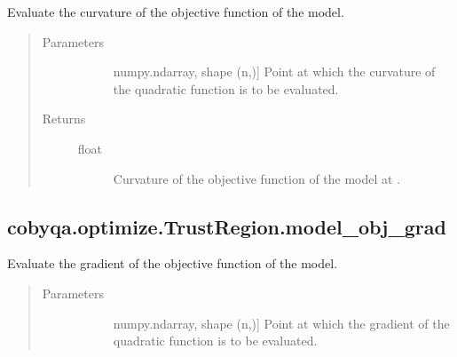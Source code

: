\documentclass[letterpaper,10pt,english]{sphinxmanual}
\begin{document}
\begin{fulllineitems}
\begin{fulllineitems}
\label{\detokenize{refs/generated/cobyqa.optimize.TrustRegion.model_obj_curv:cobyqa.optimize.TrustRegion.model_obj_curv}}
\sphinxAtStartPar
Evaluate the curvature of the objective function of the model.
\begin{quote}\begin{description}
\item[{Parameters}] \leavevmode\begin{description}
\item[{}] \leavevmode{[}numpy.ndarray, shape (n,){]}
\sphinxAtStartPar
Point at which the curvature of the quadratic function is to be
evaluated.

\end{description}

\item[{Returns}] \leavevmode\begin{description}
\item[{float}] \leavevmode
\sphinxAtStartPar
Curvature of the objective function of the model at .

\end{description}

\end{description}\end{quote}

\end{fulllineitems}



\subsection{cobyqa.optimize.TrustRegion.model\_obj\_grad}
\label{\detokenize{refs/generated/cobyqa.optimize.TrustRegion.model_obj_grad:cobyqa-optimize-trustregion-model-obj-grad}}\label{\detokenize{refs/generated/cobyqa.optimize.TrustRegion.model_obj_grad::doc}}

\begin{fulllineitems}
\label{\detokenize{refs/generated/cobyqa.optimize.TrustRegion.model_obj_grad:cobyqa.optimize.TrustRegion.model_obj_grad}}
\sphinxAtStartPar
Evaluate the gradient of the objective function of the model.
\begin{quote}\begin{description}
\item[{Parameters}] \leavevmode\begin{description}
\item[{}] \leavevmode{[}numpy.ndarray, shape (n,){]}
\sphinxAtStartPar
Point at which the gradient of the quadratic function is to be
evaluated.


\end{description}
\end{description}
\end{quote}
\end{fulllineitems}
\end{fulllineitems}
\end{document}
